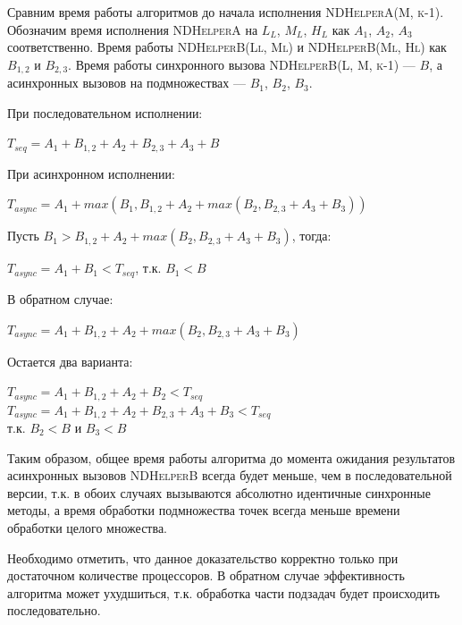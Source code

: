 Сравним время работы алгоритмов до начала исполнения \textsc{NDHelperA(M, k-1)}.
Обозначим время исполнения \textsc{NDHelperA} на $L_L$, $M_L$, $H_L$ как $A_1$, $A_2$, $A_3$ соответственно.
Время работы \textsc{NDHelperB(Ll, Ml)} и \textsc{NDHelperB(Ml, Hl)} как $B_{1,2}$ и $B_{2,3}$.
Время работы синхронного вызова \textsc{NDHelperB(L, M, k-1)} --- $B$, а асинхронных вызовов на подмножествах --- $B_1$, $B_2$, $B_3$.

При последовательном исполнении:
\begin{center}
    $T_{seq} = A_1 + B_{1,2} + A_2 + B_{2,3} + A_3 + B$
\end{center}

При асинхронном исполнении:
\begin{center}
    $T_{async} = A_1 + max(B_1, B_{1,2} + A_2 + max(B_2, B_{2,3} + A_3 + B_3))$\\
\end{center}

Пусть $B_1 > B_{1,2} + A_2 + max(B_2, B_{2,3} + A_3 + B_3)$, тогда:
\begin{center}
    $T_{async} = A_1 + B_1 < T_{seq}$, т.к. $B_1 < B$
\end{center}

В обратном случае:
\begin{center}
    $T_{async} = A_1 + B_{1,2} + A_2 + max(B_2, B_{2,3} + A_3 + B_3)$
\end{center}

Остается два варианта:
\begin{center}
    $T_{async} = A_1 + B_{1,2} + A_2 + B_2 < T_{seq}$\\
    $T_{async} = A_1 + B_{1,2} + A_2 + B_{2,3} + A_3 + B_3 < T_{seq}$\\
    т.к. $B_2 < B$ и $B_3 < B$
\end{center}

Таким образом, общее время работы алгоритма до момента ожидания результатов асинхронных вызовов \textsc{NDHelperB} всегда будет меньше, чем в последовательной версии, т.к. в обоих случаях вызываются абсолютно идентичные синхронные методы, а время обработки подмножества точек всегда меньше времени обработки целого множества.

Необходимо отметить, что данное доказательство корректно только при достаточном количестве процессоров.
В обратном случае эффективность алгоритма может ухудшиться, т.к. обработка части подзадач будет происходить последовательно.


